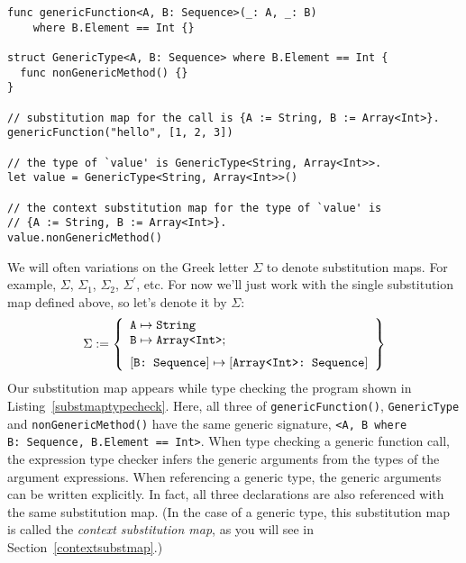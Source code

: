 \documentclass[../generics]{subfiles}
\begin{document}
\begin{listing}\label{substmaptypecheck}
\begin{Verbatim}
func genericFunction<A, B: Sequence>(_: A, _: B)
    where B.Element == Int {}

struct GenericType<A, B: Sequence> where B.Element == Int {
  func nonGenericMethod() {}
}

// substitution map for the call is {A := String, B := Array<Int>}.
genericFunction("hello", [1, 2, 3])

// the type of `value' is GenericType<String, Array<Int>>.
let value = GenericType<String, Array<Int>>()

// the context substitution map for the type of `value' is
// {A := String, B := Array<Int>}.
value.nonGenericMethod()
\end{Verbatim}
\end{listing}

\begin{example}
We will often variations on the Greek letter $\Sigma$ to denote substitution maps. For example, $\Sigma$, $\Sigma_1$, $\Sigma_2$, $\Sigma^\prime$, etc. For now we'll just work with the single substitution map defined above, so let's denote it by $\Sigma$:
\[
\Sigma := \SubstMapLongC{
\SubstType{A}{String}\\
\SubstType{B}{Array<Int>}
}{
\SubstConf{B}{Array<Int>}{Sequence}
}
\]
Our substitution map appears while type checking the program shown in Listing~\ref{substmaptypecheck}. Here, all three of \texttt{genericFunction()}, \texttt{GenericType} and \texttt{nonGenericMethod()} have the same generic signature, \texttt{<A, B where B:~Sequence, B.Element == Int>}. When type checking a generic function call, the expression type checker infers the generic arguments from the types of the argument expressions. When referencing a generic type, the generic arguments can be written explicitly. In fact, all three declarations are also referenced with the same substitution map. (In the case of a generic type, this substitution map is called the \emph{context substitution map}, as you will see in Section~\ref{contextsubstmap}.)
\end{example}
\end{document}
